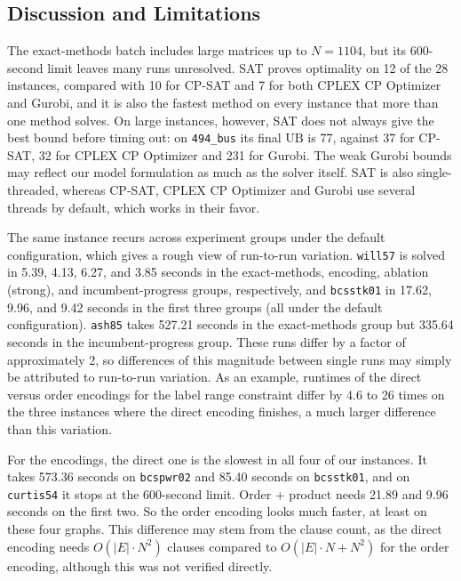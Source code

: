 \documentclass[a4paper,fleqn]{cas-sc}
\begin{document}
    \subsection{Discussion and Limitations}

        The exact-methods batch includes large matrices up to $N=1104$, but its 600-second limit leaves many runs unresolved. SAT proves optimality on 12 of the 28 instances, compared with 10 for CP-SAT and 7 for both CPLEX CP Optimizer and Gurobi, and it is also the fastest method on every instance that more than one method solves. On large instances, however, SAT does not always give the best bound before timing out: on \texttt{494\_bus} its final $\text{UB}$ is 77, against 37 for CP-SAT, 32 for CPLEX CP Optimizer and 231 for Gurobi. The weak Gurobi bounds may reflect our model formulation as much as the solver itself. SAT is also single-threaded, whereas CP-SAT, CPLEX CP Optimizer and Gurobi use several threads by default, which works in their favor.

        The same instance recurs across experiment groups under the default configuration, which gives a rough view of run-to-run variation. \texttt{will57} is solved in 5.39, 4.13, 6.27, and 3.85 seconds in the exact-methods, encoding, ablation (strong), and incumbent-progress groups, respectively, and \texttt{bcsstk01} in 17.62, 9.96, and 9.42 seconds in the first three groups (all under the default configuration). \texttt{ash85} takes 527.21 seconds in the exact-methods group but 335.64 seconds in the incumbent-progress group. These runs differ by a factor of approximately 2, so differences of this magnitude between single runs may simply be attributed to run-to-run variation. As an example, runtimes of the direct versus order encodings for the label range constraint differ by 4.6 to 26 times on the three instances where the direct encoding finishes, a much larger difference than this variation.

        For the encodings, the direct one is the slowest in all four of our instances. It takes 573.36 seconds on \texttt{bcspwr02} and 85.40 seconds on \texttt{bcsstk01}, and on \texttt{curtis54} it stops at the 600-second limit. Order + product needs 21.89 and 9.96 seconds on the first two. So the order encoding looks much faster, at least on these four graphs. This difference may stem from the clause count, as the direct encoding needs $O(|E| \cdot N^2)$ clauses compared to $O(|E| \cdot N + N^2)$ for the order encoding, although this was not verified directly.
\end{document}
